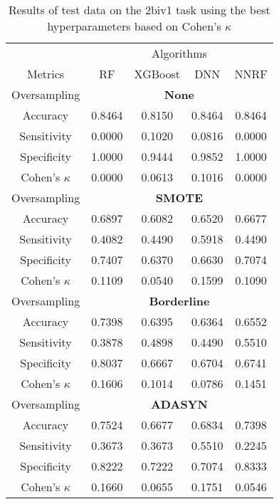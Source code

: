 \begin{table}[!htb]
\centering
\caption{Results of test data on the 2biv1 task using the best hyperparameters based on Cohen's $\kappa$}
\label{tab:2biv1_test_results}
\begin{tabular}{c | c c c c}
\hline
 & \multicolumn{4}{c}{Algorithms}\\ 
Metrics &RF & XGBoost & DNN & NNRF\\ 
\hline
Oversampling &\multicolumn{4}{|c}{\textbf{None}}\\ 
\hline
Accuracy & 0.8464 & 0.8150 & 0.8464 & 0.8464\\ 
Sensitivity & 0.0000 & 0.1020 & 0.0816 & 0.0000\\ 
Specificity & 1.0000 & 0.9444 & 0.9852 & 1.0000\\ 
Cohen's $\kappa$ & 0.0000 & 0.0613 & 0.1016 & 0.0000\\ 
\hline
Oversampling &\multicolumn{4}{|c}{\textbf{SMOTE}}\\ 
\hline
Accuracy & 0.6897 & 0.6082 & 0.6520 & 0.6677\\ 
Sensitivity & 0.4082 & 0.4490 & 0.5918 & 0.4490\\ 
Specificity & 0.7407 & 0.6370 & 0.6630 & 0.7074\\ 
Cohen's $\kappa$ & 0.1109 & 0.0540 & 0.1599 & 0.1090\\ 
\hline
Oversampling &\multicolumn{4}{|c}{\textbf{Borderline}}\\ 
\hline
Accuracy & 0.7398 & 0.6395 & 0.6364 & 0.6552\\ 
Sensitivity & 0.3878 & 0.4898 & 0.4490 & 0.5510\\ 
Specificity & 0.8037 & 0.6667 & 0.6704 & 0.6741\\ 
Cohen's $\kappa$ & 0.1606 & 0.1014 & 0.0786 & 0.1451\\ 
\hline
Oversampling &\multicolumn{4}{|c}{\textbf{ADASYN}}\\ 
\hline
Accuracy & 0.7524 & 0.6677 & 0.6834 & 0.7398\\ 
Sensitivity & 0.3673 & 0.3673 & 0.5510 & 0.2245\\ 
Specificity & 0.8222 & 0.7222 & 0.7074 & 0.8333\\ 
Cohen's $\kappa$ & 0.1660 & 0.0655 & 0.1751 & 0.0546\\ 
\hline
\end{tabular}
\end{table}

